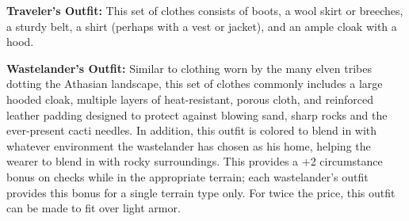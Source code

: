 \textbf{Traveler's Outfit:} This set of clothes consists of boots, a wool skirt or breeches, a sturdy belt, a shirt (perhaps with a vest or jacket), and an ample cloak with a hood.

\textbf{Wastelander’s Outfit:} Similar to clothing worn by the many elven tribes dotting the Athasian landscape, this set of clothes commonly includes a large hooded cloak, multiple layers of heat-resistant, porous cloth, and reinforced leather padding designed to protect against blowing sand, sharp rocks and the ever-present cacti needles. In addition, this outfit is colored to blend in with whatever environment the wastelander has chosen as his home, helping the wearer to blend in with rocky surroundings. This provides a +2 circumstance bonus on  checks while in the appropriate terrain; each wastelander’s outfit provides this bonus for a single terrain type only. For twice the price, this outfit can be made to fit over light armor.
